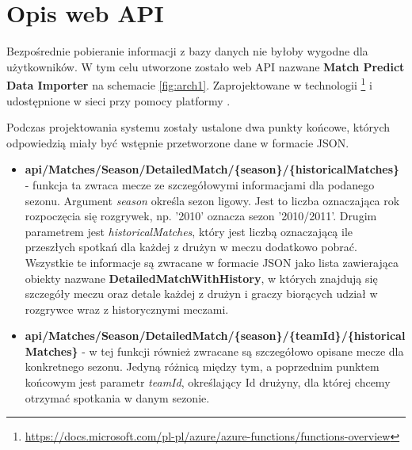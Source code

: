 \section{Opis web API} \label{arch:webApi}
\noindent
Bezpośrednie pobieranie informacji z bazy danych nie byłoby wygodne dla użytkowników. W tym celu utworzone zostało web API nazwane \textbf{Match Predict Data Importer} na schemacie \ref{fig:arch1}. Zaprojektowane w technologii \footnote{\url{https://docs.microsoft.com/pl-pl/azure/azure-functions/functions-overview}} i udostępnione w sieci przy pomocy platformy .

Podczas projektowania systemu zostały ustalone dwa punkty końcowe, których odpowiedzią miały być wstępnie przetworzone dane w formacie JSON.
\begin{itemize}
    \item \textbf{api/Matches/Season/DetailedMatch/\{season\}/\{historicalMatches\}} - funkcja ta zwraca mecze ze szczegółowymi informacjami dla podanego sezonu. Argument \textit{season} określa sezon ligowy. Jest to liczba oznaczająca rok rozpoczęcia się rozgrywek, np. '2010' oznacza sezon '2010/2011'. Drugim parametrem jest \textit{historicalMatches}, który jest liczbą oznaczającą ile przeszłych spotkań dla każdej z drużyn w meczu dodatkowo pobrać. Wszystkie te informacje są zwracane w formacie JSON jako lista zawierająca obiekty nazwane \textbf{DetailedMatchWithHistory}, w których znajdują się szczegóły meczu oraz detale każdej z drużyn i graczy biorących udział w rozgrywce wraz z historycznymi meczami. 
    \item \textbf{api/Matches/Season/DetailedMatch/\{season\}/\{teamId\}/\{historicalMatches\}} - w tej funkcji również zwracane są szczegółowo opisane mecze dla konkretnego sezonu. Jedyną różnicą między tym, a poprzednim punktem końcowym jest parametr \textit{teamId}, określający Id drużyny, dla której chcemy otrzymać spotkania w danym sezonie.
\end{itemize}

